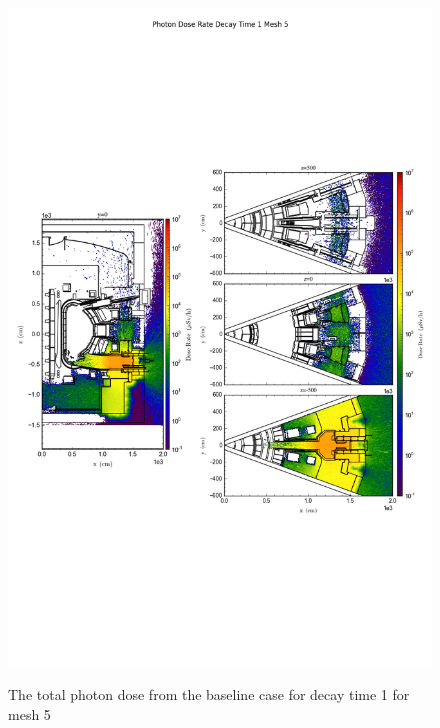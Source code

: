 \begin{figure}[ht!]
\centering
\includegraphics[trim={0cm 9cm 0cm 10cm},clip,scale=0.75]{../plots/final_model/Photon_Dose_Rate_Decay_Time_1_Mesh_5.png}
\label{fig:photons_dc1_no4bc_m5_flux}
\caption{The total photon dose from the baseline case for decay time 1 for mesh 5}
\end{figure}
